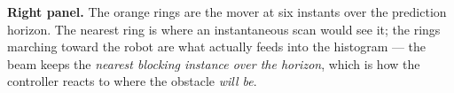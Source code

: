 \textbf{Right panel.} The orange rings are the mover at six instants over the
prediction horizon. The nearest ring is where an instantaneous scan would see
it; the rings marching toward the robot are what 
actually feeds into the histogram --- the beam keeps the \emph{nearest
blocking instance over the horizon}, which is how the controller reacts to
where the obstacle \emph{will be}.
